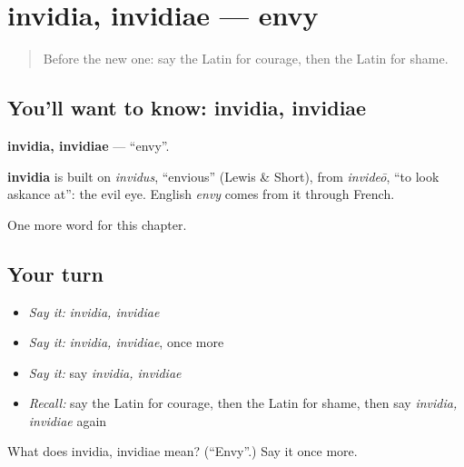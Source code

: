 \section[invidia, invidiae]{invidia, invidiae — envy}

\label{lesson:LA-C262-invidia}



\begin{quote}
Before the new one: say the Latin for courage, then the Latin for shame.
\end{quote}

\subsection*{You'll want to know: invidia, invidiae}
\textbf{invidia, invidiae} — \textquotedblleft{}envy\textquotedblright{}.

\begin{cousinweb}
\textbf{invidia} is built on \emph{invidus}, \textquotedblleft{}envious\textquotedblright{} (Lewis \& Short), from \emph{invideō}, \textquotedblleft{}to look askance at\textquotedblright{}: the evil eye. English \emph{envy} comes from it through French.
\end{cousinweb}

\begin{grammarlens}[title={What you've built}]
One more word for this chapter.
\end{grammarlens}

\subsection*{Your turn}
\begin{itemize}
\raggedright
  \item \emph{Say it:} \emph{invidia, invidiae}
  \item \emph{Say it:} \emph{invidia, invidiae}, once more
  \item \emph{Say it:} say \emph{invidia, invidiae}
  \item \emph{Recall:} say the Latin for courage, then the Latin for shame, then say \emph{invidia, invidiae} again
\end{itemize}

\begin{tcolorbox}[breakable,colback=teal!4,colframe=teal!35!black,title={Before you move on}]
What does invidia, invidiae mean? (\textquotedblleft{}Envy\textquotedblright{}.) Say it once more.
\end{tcolorbox}
